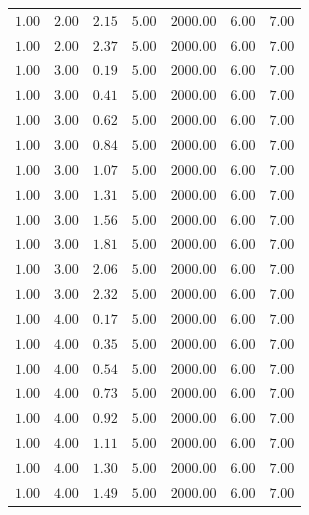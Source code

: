 \begin{longtable}[c]{lllllll}
   $1.00$  & $2.00$  & $2.15$   & $5.00$ & $2000.00$ & $6.00$               & $7.00$      \\
   $1.00$  & $2.00$  & $2.37$   & $5.00$ & $2000.00$ & $6.00$               & $7.00$      \\
   $1.00$  & $3.00$  & $0.19$   & $5.00$ & $2000.00$ & $6.00$               & $7.00$      \\
   $1.00$  & $3.00$  & $0.41$   & $5.00$ & $2000.00$ & $6.00$               & $7.00$      \\
   $1.00$  & $3.00$  & $0.62$   & $5.00$ & $2000.00$ & $6.00$               & $7.00$      \\
   $1.00$  & $3.00$  & $0.84$   & $5.00$ & $2000.00$ & $6.00$               & $7.00$      \\
   $1.00$  & $3.00$  & $1.07$   & $5.00$ & $2000.00$ & $6.00$               & $7.00$      \\
   $1.00$  & $3.00$  & $1.31$   & $5.00$ & $2000.00$ & $6.00$               & $7.00$      \\
   $1.00$  & $3.00$  & $1.56$   & $5.00$ & $2000.00$ & $6.00$               & $7.00$      \\
   $1.00$  & $3.00$  & $1.81$   & $5.00$ & $2000.00$ & $6.00$               & $7.00$      \\
   $1.00$  & $3.00$  & $2.06$   & $5.00$ & $2000.00$ & $6.00$               & $7.00$      \\
   $1.00$  & $3.00$  & $2.32$   & $5.00$ & $2000.00$ & $6.00$               & $7.00$      \\
   $1.00$  & $4.00$  & $0.17$   & $5.00$ & $2000.00$ & $6.00$               & $7.00$      \\
   $1.00$  & $4.00$  & $0.35$   & $5.00$ & $2000.00$ & $6.00$               & $7.00$      \\
   $1.00$  & $4.00$  & $0.54$   & $5.00$ & $2000.00$ & $6.00$               & $7.00$      \\
   $1.00$  & $4.00$  & $0.73$   & $5.00$ & $2000.00$ & $6.00$               & $7.00$      \\
   $1.00$  & $4.00$  & $0.92$   & $5.00$ & $2000.00$ & $6.00$               & $7.00$      \\
   $1.00$  & $4.00$  & $1.11$   & $5.00$ & $2000.00$ & $6.00$               & $7.00$      \\
   $1.00$  & $4.00$  & $1.30$   & $5.00$ & $2000.00$ & $6.00$               & $7.00$      \\
   $1.00$  & $4.00$  & $1.49$   & $5.00$ & $2000.00$ & $6.00$               & $7.00$      \\

\end{longtable}
